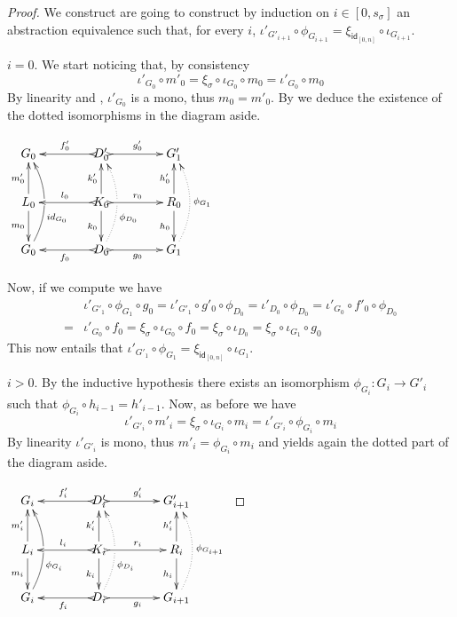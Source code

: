 \documentclass[a4paper,UKenglish,cleveref,pdftex,thm-restate,numberwithinsect]{lipics-v2021}
\newcommand{\id}[1]{\mathsf{id}_{#1}}
\def\G{\textbf {\textup{G}}}
\begin{document}
\begin{proof}We construct are going to construct by induction on $i\in [0,s_\sigma]$ an abstraction equivalence such that, for every $i$, $\iota'_{G'_{i+1}}\circ \phi_{G_{i+1}}=\xi_{\id{[0,n]}}\circ \iota_{G_{i+1}}$.
	
	\smallskip \noindent \parbox{8.2cm}{$i=0$. We start noticing that, by consistency
		\[\iota'_{G_0}\circ m'_0=\xi_\sigma \circ \iota_{G_0}\circ m_0=\iota'_{G_0}\circ m_0\]
		By linearity and , $\iota'_{G_0}$ is a mono, thus $m_0=m'_0$. By   we deduce the existence of the dotted isomorphisms in the diagram aside.} \parbox{4cm}{\vspace{0ex}$\xymatrix@C=40pt{G_0&D'_0 \ar@{>->}[r]^{g'_0}
			\ar@{>->}[l]_{f'_0}&G'_{1}\\ L_0 \ar[u]^{m'_0} \ar[d]_{m_0}& K_0
			\ar[u]^{k'_0} \ar[d]_{k_0} \ar@{>->}[r]^{r_0} \ar@{>->}[l]_{l_0}
			&R_0\ar[u]^{h'_0} \ar[d]_{h_0}\\G_0
			\ar@/_.45cm/[uu]_(.35){\id{G_0}}|\hole& D_0 \ar@{>->}[l]^{f_0}  \ar@{.>}@/_.45cm/[uu]_(.35){\phi_{D_0}}|\hole
			\ar@{>->}[r]_{g_0}& G_{1}\ar@{.>}@/_.45cm/[uu]_{\phi_{G_1}}}$}
	
	Now, if we compute we have
	\begin{align*}
		&\iota'_{G'_1}\circ \phi_{G_1}\circ g_0=\iota'_{G'_1}\circ g'_0\circ \phi_{D_0}=\iota'_{D_0}\circ \phi_{D_0}=\iota'_{G_0}\circ f'_0\circ \phi_{D_0}\\=&\iota'_{G_0}\circ f_0=\xi_{\sigma} \circ \iota_{G_0}\circ  f_0=\xi_{\sigma} \circ \iota_{D_0}=\xi_{\sigma} \circ \iota_{G_1}\circ g_0 
	\end{align*}
	This now entails that $\iota'_{G'_1}\circ \phi_{G_1}=\xi_{\id{[0,n]}}\circ \iota_{G_1}$.
	
	
	\smallskip  \noindent \parbox{7.5cm}{$i>0$. By the inductive hypothesis there exists an isomorphism $\phi_{G_{i}}\colon G_{i}\to G'_i$ such that $\phi_{G_{i}}\circ h_{i-1}=h'_{i-1}$. Now, as before we have
		\[\iota'_{G'_{i}}\circ m'_{i}=\xi_{\sigma}\circ \iota_{G_i}\circ m_{i}=\iota'_{G'_{i}}\circ \phi_{G_{i}} \circ m_i \]
		By linearity $\iota'_{G'_{i}}$ is mono, thus $m'_i=\phi_{G_{i}} \circ m_i$ and  yields again the dotted part of the diagram aside.}
	\parbox{4cm}{\vspace{-2em}$\xymatrix@C=40pt{G_i&D'_i \ar@{>->}[r]^{g'_i}
			\ar@{>->}[l]_{f'_i}&G'_{i+1}\\ L_i \ar[u]^{m'_i} \ar[d]_{m_i}& K_i
			\ar[u]^{k'_i} \ar[d]_{k_i} \ar@{>->}[r]^{r_i} \ar@{>->}[l]_{l_i}
			&R_i\ar[u]^{h'_i} \ar[d]_{h_i}\\G_i
			\ar@/_.45cm/[uu]_(.35){\phi_{G_i}}|\hole& D_i \ar@{>->}[l]^{f_i}  \ar@{.>}@/_.45cm/[uu]_(.35){\phi_{D_i}}|\hole
			\ar@{>->}[r]_{g_i}& G_{i+1}\ar@{.>}@/_.45cm/[uu]_{\phi_{G_{i+1}}}}$}
	

\end{proof}
\end{document}
